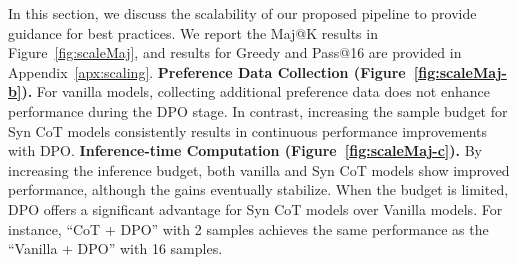 In this section, we discuss the scalability of our proposed pipeline to provide guidance for best practices. We report the Maj@K results in Figure~\ref{fig:scaleMaj}, and results for Greedy and Pass@16 are provided in Appendix~\ref{apx:scaling}.
\textbf{Preference Data Collection (Figure~\ref{fig:scaleMaj-b}).} For vanilla models, collecting additional preference data does not enhance performance during the DPO stage. In contrast, increasing the sample budget for Syn CoT models consistently results in continuous performance improvements with DPO. %
\textbf{Inference-time Computation (Figure~\ref{fig:scaleMaj-c}).} 
By increasing the inference budget, both vanilla and Syn CoT models show improved performance, although the gains eventually stabilize. When the budget is limited, DPO offers a significant advantage for Syn CoT models over Vanilla models. For instance, ``CoT + DPO'' with 2 samples achieves the same performance as the ``Vanilla + DPO'' with 16 samples.



